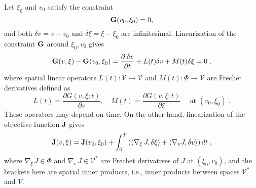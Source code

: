Let $\xi_0$ and $v_0$ satisfy the constraint
$$ {\bf G}(v_0,\xi_0) = 0 ,$$
and both $\delta v = v - v_0$ and $\delta \xi = \xi - \xi_0$ are infinitesimal.
Linearization of the constraint $\bf G$ around $\xi_0,v_0$ gives
\begin{equation} \label{constraint_l}
 {\bf G}(v,\xi) - {\bf G}(v_0,\xi_0)
 = \frac{\partial\: \delta v}{\partial t} + L(t) \delta v
                                                + M(t) \delta\xi = 0 \;,
\end{equation}
where spatial linear operators $L(t) : {\mathcal V} \rightarrow {\mathcal V}$
and $M(t) : \Phi \rightarrow {\mathcal V}$ are Frechet derivatives defined as
$$ L(t) = \frac{\partial G(v, \xi; t)}{\partial v},\quad
   M(t) = \frac{\partial G(v, \xi; t)}{\partial \xi} \quad
   \mbox{ at } (v_0, \xi_0) \;.$$
These operators may depend on time.  On the other hand, linearization of the
objective function $\bf J$ gives
\begin{equation} \label{td_obj_diff}
  {\bf J}(v,\xi) = {\bf J}(v_0,\xi_0)
 + \int_0^T \left(\langle \nabla_{\xi}\, J, \delta\xi \rangle
                + \langle \nabla_v J, \delta v \rangle \right) dt \;,
\end{equation}
where $\nabla_{\xi}\,J \in \Phi$ and $\nabla_v\,J \in \mathcal{V}^*$ are
Frechet derivatives of $J$ at $(\xi_0,v_0)$, and the brackets here are
spatial inner products, i.e., inner products between spaces $\mathcal V^*$ and
$\mathcal V$.

